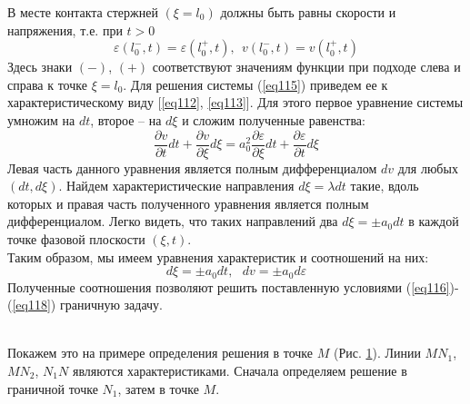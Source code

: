 \documentclass[specialist, subf, href, colorlinks=true, 14pt, final]{disser}
\theoremstyle{definition}
\newcommand{\pdfrac}[2]{\frac{\partial #1}{\partial #2}}
\begin{document}
В месте контакта стержней $(\xi = l_{0})$ должны быть равны скорости
и напряжения, т.е. при $t > 0$
\begin{equation}\label{eq118}
  \varepsilon(l_{0}^{-}, t) =\varepsilon(l_{0}^{+}, t),\ \ v(l_{0}^{-}, t) = v(l_{0}^{+}, t)
\end{equation}
Здесь знаки $(-)$, $(+)$ соответствуют значениям функции при подходе слева и справа к точке $\xi = l_0$. Для решения системы (\ref{eq115}) приведем ее к характеристическому виду [\ref{eq112}, \ref{eq113}]. Для этого первое уравнение системы умножим на $dt$, второе -- на $d\xi$ и сложим полученные равенства:
\[
  \pdfrac{v}{t}dt + \pdfrac{v}{\xi}d\xi = a_{0}^{2}\pdfrac{\varepsilon}{\xi}dt + \pdfrac{\varepsilon}{t}d\xi
\]
Левая часть данного уравнения является полным дифференциалом $dv$ для любых $(dt, d\xi)$. Найдем характеристические направления $d\xi = \lambda dt$ такие, вдоль которых и правая часть полученного уравнения является полным дифференциалом. Легко видеть, что таких направлений два $d\xi = \pm a_{0}dt$ в каждой точке фазовой плоскости $(\xi, t)$. \\
Таким образом, мы имеем уравнения характеристик и соотношений на них:
\begin{equation}\label{eq119}
  d\xi = \pm a_{0}dt,\ \ \ dv = \pm a_{0}d\varepsilon
\end{equation}
Полученные соотношения позволяют решить поставленную условиями (\ref{eq116})-(\ref{eq118}) граничную задачу.\\
\begin{figure}[!htp]
  \caption{}
  \label{1-1-2}
\end{figure}
\\
Покажем это на примере определения решения в точке $M$ (Рис. \ref{1-1-2}). Линии $MN_1$, $MN_2$, $N_{1}N$ являются характеристиками. Сначала определяем решение в граничной точке $N_1$, затем в точке $M$.\\
\end{document}
